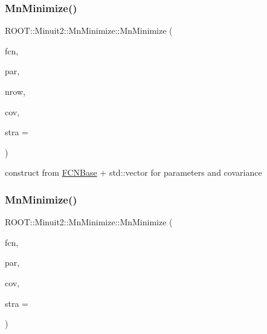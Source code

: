\mbox{\label{classROOT_1_1Minuit2_1_1MnMinimize_ad6015768309e01c6610185006008b2d5}} 
\subsubsection{\texorpdfstring{MnMinimize()}{MnMinimize()}\hspace{0.1cm}{\footnotesize\ttfamily [2/26]}}
{\footnotesize\ttfamily R\+O\+O\+T\+::\+Minuit2\+::\+Mn\+Minimize\+::\+Mn\+Minimize (\begin{DoxyParamCaption}\item[{const \mbox{\hyperlink{classROOT_1_1Minuit2_1_1FCNBase}{F\+C\+N\+Base}} \&}]{fcn,  }\item[{const std\+::vector$<$ double $>$ \&}]{par,  }\item[{unsigned int}]{nrow,  }\item[{const std\+::vector$<$ double $>$ \&}]{cov,  }\item[{unsigned int}]{stra = {} }\end{DoxyParamCaption})\hspace{0.3cm}{\ttfamily [inline]}}



construct from \mbox{\hyperlink{classROOT_1_1Minuit2_1_1FCNBase}{F\+C\+N\+Base}} + std\+::vector for parameters and covariance 

\mbox{\label{classROOT_1_1Minuit2_1_1MnMinimize_a4cf2e37839cc454720ab3bd8041dffa9}} 
\subsubsection{\texorpdfstring{MnMinimize()}{MnMinimize()}\hspace{0.1cm}{\footnotesize\ttfamily [3/26]}}
{\footnotesize\ttfamily R\+O\+O\+T\+::\+Minuit2\+::\+Mn\+Minimize\+::\+Mn\+Minimize (\begin{DoxyParamCaption}\item[{const \mbox{\hyperlink{classROOT_1_1Minuit2_1_1FCNBase}{F\+C\+N\+Base}} \&}]{fcn,  }\item[{const std\+::vector$<$ double $>$ \&}]{par,  }\item[{const \mbox{\hyperlink{classROOT_1_1Minuit2_1_1MnUserCovariance}{Mn\+User\+Covariance}} \&}]{cov,  }\item[{unsigned int}]{stra = {} }\end{DoxyParamCaption})\hspace{0.3cm}{\ttfamily [inline]}}



